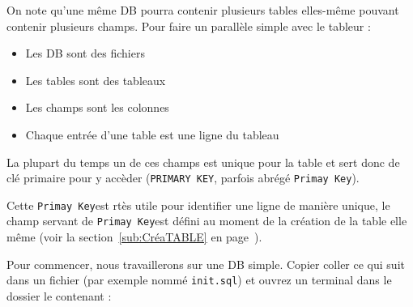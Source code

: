 \documentclass[a4paper, 11pt]{report}
\newcommand\pk{\texttt{Primay Key}}
\begin{document}
On note qu'une même DB pourra contenir plusieurs tables elles-même pouvant contenir plusieurs champs.
Pour faire un parallèle simple avec le tableur :

\begin{itemize}
    \item Les DB sont des fichiers
    \item Les tables sont des tableaux
    \item Les champs sont les colonnes
    \item Chaque entrée d'une table est une ligne du tableau
\end{itemize}

La plupart du temps un de ces champs est unique pour la table et sert donc de clé primaire pour y accèder (\texttt{PRIMARY KEY}, parfois abrégé \pk).

Cette \pk est rtès utile pour identifier une ligne de manière unique, le champ servant de \pk est défini au moment de la création de la table elle même (voir la section~\ref{sub:CréaTABLE} en page~\pageref{sub:CréaTABLE}).

Pour commencer, nous travaillerons sur une DB simple.
Copier coller ce qui suit dans un fichier (par exemple nommé \texttt{init.sql}) et ouvrez un terminal dans le dossier le contenant :
\end{document}
